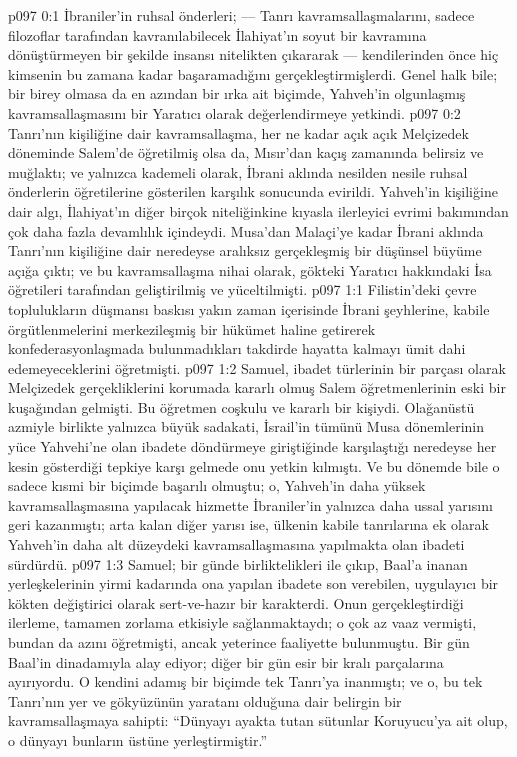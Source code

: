 \vs p097 0:1 İbraniler’in ruhsal önderleri; --- Tanrı kavramsallaşmalarını, sadece filozoflar tarafından kavranılabilecek İlahiyat’ın soyut bir kavramına dönüştürmeyen bir şekilde insansı nitelikten çıkararak --- kendilerinden önce hiç kimsenin bu zamana kadar başaramadığını gerçekleştirmişlerdi. Genel halk bile; bir birey olmasa da en azından bir ırka ait biçimde, Yahveh’in olgunlaşmış kavramsallaşmasını bir Yaratıcı olarak değerlendirmeye yetkindi.
\vs p097 0:2 Tanrı’nın kişiliğine dair kavramsallaşma, her ne kadar açık açık Melçizedek döneminde Salem’de öğretilmiş olsa da, Mısır’dan kaçış zamanında belirsiz ve muğlaktı; ve yalnızca kademeli olarak, İbrani aklında nesilden nesile ruhsal önderlerin öğretilerine gösterilen karşılık sonucunda evirildi. Yahveh’in kişiliğine dair algı, İlahiyat’ın diğer birçok niteliğinkine kıyasla ilerleyici evrimi bakımından çok daha fazla devamlılık içindeydi. Musa’dan Malaçi’ye kadar İbrani aklında Tanrı’nın kişiliğine dair neredeyse aralıksız gerçekleşmiş bir düşünsel büyüme açığa çıktı; ve bu kavramsallaşma nihai olarak, gökteki Yaratıcı hakkındaki İsa öğretileri tarafından geliştirilmiş ve yüceltilmişti.
\vs p097 1:1 Filistin’deki çevre toplulukların düşmansı baskısı yakın zaman içerisinde İbrani şeyhlerine, kabile örgütlenmelerini merkezileşmiş bir hükümet haline getirerek konfederasyonlaşmada bulunmadıkları takdirde hayatta kalmayı ümit dahi edemeyeceklerini öğretmişti.
\vs p097 1:2 Samuel, ibadet türlerinin bir parçası olarak Melçizedek gerçekliklerini korumada kararlı olmuş Salem öğretmenlerinin eski bir kuşağından gelmişti. Bu öğretmen coşkulu ve kararlı bir kişiydi. Olağanüstü azmiyle birlikte yalnızca büyük sadakati, İsrail’in tümünü Musa dönemlerinin yüce Yahvehi’ne olan ibadete döndürmeye giriştiğinde karşılaştığı neredeyse her kesin gösterdiği tepkiye karşı gelmede onu yetkin kılmıştı. Ve bu dönemde bile o sadece kısmi bir biçimde başarılı olmuştu; o, Yahveh’in daha yüksek kavramsallaşmasına yapılacak hizmette İbraniler’in yalnızca daha ussal yarısını geri kazanmıştı; arta kalan diğer yarısı ise, ülkenin kabile tanrılarına ek olarak Yahveh’in daha alt düzeydeki kavramsallaşmasına yapılmakta olan ibadeti sürdürdü.
\vs p097 1:3 Samuel; bir günde birliktelikleri ile çıkıp, Baal’a inanan yerleşkelerinin yirmi kadarında ona yapılan ibadete son verebilen, uygulayıcı bir kökten değiştirici olarak sert\hyp{}ve\hyp{}hazır bir karakterdi. Onun gerçekleştirdiği ilerleme, tamamen zorlama etkisiyle sağlanmaktaydı; o çok az vaaz vermişti, bundan da azını öğretmişti, ancak yeterince faaliyette bulunmuştu. Bir gün Baal’in dinadamıyla alay ediyor; diğer bir gün esir bir kralı parçalarına ayırıyordu. O kendini adamış bir biçimde tek Tanrı’ya inanmıştı; ve o, bu tek Tanrı’nın yer ve gökyüzünün yaratanı olduğuna dair belirgin bir kavramsallaşmaya sahipti: “Dünyayı ayakta tutan sütunlar Koruyucu’ya ait olup, o dünyayı bunların üstüne yerleştirmiştir.”
